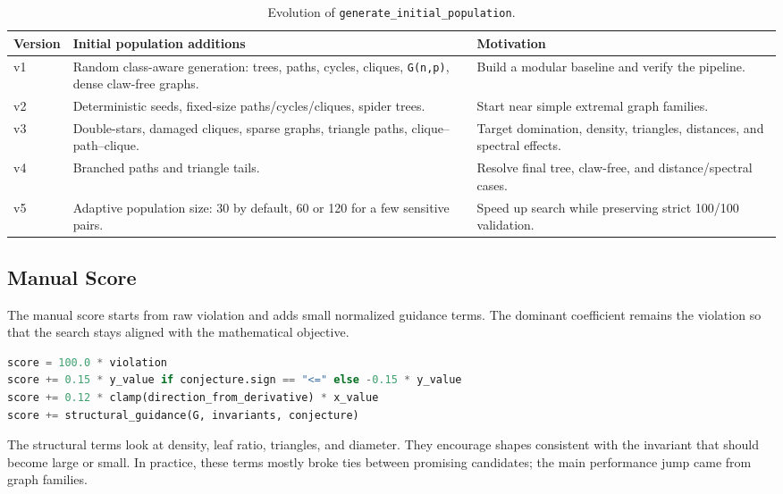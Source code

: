 \documentclass[11pt,a4paper]{article}
\begin{document}
\begin{table}[H]
\centering
\begin{tabular}{p{1.3cm}p{6.2cm}p{6cm}}
\toprule
Version & Initial population additions & Motivation \\
\midrule
v1 & Random class-aware generation: trees, paths, cycles, cliques, \texttt{G(n,p)}, dense claw-free graphs. & Build a modular baseline and verify the pipeline. \\
v2 & Deterministic seeds, fixed-size paths/cycles/cliques, spider trees. & Start near simple extremal graph families. \\
v3 & Double-stars, damaged cliques, sparse graphs, triangle paths, clique--path--clique. & Target domination, density, triangles, distances, and spectral effects. \\
v4 & Branched paths and triangle tails. & Resolve final tree, claw-free, and distance/spectral cases. \\
v5 & Adaptive population size: 30 by default, 60 or 120 for a few sensitive pairs. & Speed up search while preserving strict 100/100 validation. \\
\bottomrule
\end{tabular}
\caption{Evolution of \texttt{generate\_initial\_population}.}
\end{table}

\subsection{Manual Score}

The manual score starts from raw violation and adds small normalized guidance terms. The dominant coefficient remains the violation so that the search stays aligned with the mathematical objective.

\begin{lstlisting}[language=Python,caption={Simplified manual score.}]
score = 100.0 * violation
score += 0.15 * y_value if conjecture.sign == "<=" else -0.15 * y_value
score += 0.12 * clamp(direction_from_derivative) * x_value
score += structural_guidance(G, invariants, conjecture)
\end{lstlisting}

The structural terms look at density, leaf ratio, triangles, and diameter. They encourage shapes consistent with the invariant that should become large or small. In practice, these terms mostly broke ties between promising candidates; the main performance jump came from graph families.
\end{document}
